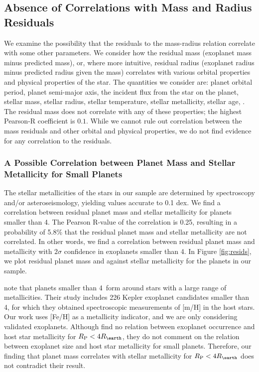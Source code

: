 \documentclass[11pt]{aastex}
\begin{document}
\subsection{Absence of Correlations with Mass and Radius Residuals}
We examine the possibility that the residuals to the mass-radius relation correlate with some other parameters.  We consider how the residual mass (exoplanet mass minus predicted mass), or, where more intuitive, residual radius (exoplanet radius minus predicted radius given the mass) correlates with various orbital properties and physical properties of the star.  The quantities we consider are: planet orbital period, planet semi-major axis, the incident flux from the star on the planet, stellar mass, stellar radius, stellar temperature, stellar metallicity, stellar age, .  The residual mass does not correlate with any of these properties; the highest Pearson-R coefficient is $0.1$.  While we cannot rule out correlation between the mass residuals and other orbital and physical properties, we do not find evidence for any correlation to the residuals.
\subsubsection{A Possible Correlation between Planet Mass and Stellar Metallicity for Small Planets}
The stellar metallicities of the stars in our sample are determined by spectroscopy and/or asteroseismology, yielding values accurate to 0.1 dex.  We find a correlation between residual planet mass and stellar metallicity for planets smaller than 4\rearth.  The Pearson R-value of the correlation is 0.25, resulting in a probability of 5.8\% that the residual planet mass and stellar metallicity are not correlated.  In other words, we find a correlation between residual planet mass and metallicity with $2\sigma$ confidence in exoplanets smaller than 4\rearth.  In Figure \ref{fig:resids}, we plot residual planet mass and against stellar metallicity for the planets in our sample.

\citet{Buchhave2012} note that planets smaller than 4\rearth\ form around stars with a large range of metallicities.  Their study includes 226 Kepler exoplanet candidates smaller than 4\rearth, for which they obtained spectroscopic measurements of [m/H] in the host stars.  Our work uses [Fe/H] as a metallicity indicator, and we are only considering validated exoplanets.  Although \citet{Buchhave2012} find no relation between exoplanet occurrence and host star metallicity for $\rpl < 4\rearth$, they do not comment on the relation between exoplanet size and host star metallicity for small planets.  Therefore, our finding that planet mass correlates with stellar metallicity for $\rpl < 4\rearth$ does not contradict their result.
\end{document}

